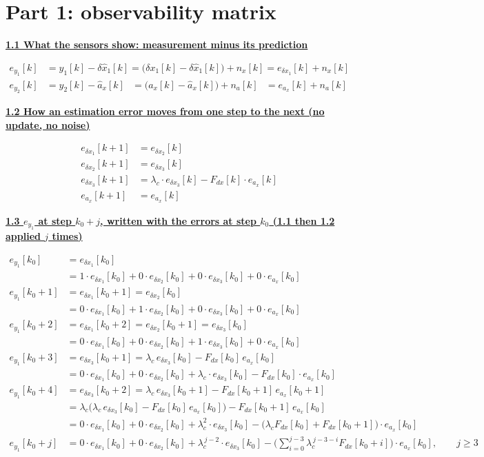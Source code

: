 \documentclass[11pt,a4paper]{ctexart}
\newcommand{\lc}{\lambda_c}
\newcommand{\hd}[1]{\par\medskip\noindent\underline{\textbf{#1}}\par\nobreak\vspace{0.2ex}}
\begin{document}
\section{Part 1: observability matrix}

\hd{1.1 What the sensors show: measurement minus its prediction}
\[
\begin{aligned}
e_{y_1}[k] &= y_1[k] - \delta\hat x_1[k] = \big(\delta x_1[k] - \delta\hat x_1[k]\big) + n_x[k] = e_{\delta x_1}[k] + n_x[k] \\
e_{y_2}[k] &= y_2[k] - \hat a_x[k] \;\;\,= \big(a_x[k] - \hat a_x[k]\big) + n_a[k] \;\;\,= e_{a_x}[k] + n_a[k]
\end{aligned}
\]

\hd{1.2 How an estimation error moves from one step to the next (no update, no noise)}
\[
\begin{aligned}
e_{\delta x_1}[k+1] &= e_{\delta x_2}[k] \\
e_{\delta x_2}[k+1] &= e_{\delta x_3}[k] \\
e_{\delta x_3}[k+1] &= \lc \cdot e_{\delta x_3}[k] - F_{dx}[k]\cdot e_{a_x}[k] \\
e_{a_x}[k+1] &= e_{a_x}[k]
\end{aligned}
\]

\hd{1.3 $e_{y_1}$ at step $k_0+j$, written with the errors at step $k_0$ (1.1 then 1.2 applied $j$ times)}
\[
\begin{aligned}
e_{y_1}[k_0] &= e_{\delta x_1}[k_0] \\
&= 1\cdot e_{\delta x_1}[k_0] + 0\cdot e_{\delta x_2}[k_0] + 0\cdot e_{\delta x_3}[k_0] + 0\cdot e_{a_x}[k_0] \\[1ex]
e_{y_1}[k_0+1] &= e_{\delta x_1}[k_0+1] = e_{\delta x_2}[k_0] \\
&= 0\cdot e_{\delta x_1}[k_0] + 1\cdot e_{\delta x_2}[k_0] + 0\cdot e_{\delta x_3}[k_0] + 0\cdot e_{a_x}[k_0] \\[1ex]
e_{y_1}[k_0+2] &= e_{\delta x_1}[k_0+2] = e_{\delta x_2}[k_0+1] = e_{\delta x_3}[k_0] \\
&= 0\cdot e_{\delta x_1}[k_0] + 0\cdot e_{\delta x_2}[k_0] + 1\cdot e_{\delta x_3}[k_0] + 0\cdot e_{a_x}[k_0] \\[1ex]
e_{y_1}[k_0+3] &= e_{\delta x_3}[k_0+1] = \lc\, e_{\delta x_3}[k_0] - F_{dx}[k_0]\, e_{a_x}[k_0] \\
&= 0\cdot e_{\delta x_1}[k_0] + 0\cdot e_{\delta x_2}[k_0] + \lc\cdot e_{\delta x_3}[k_0] - F_{dx}[k_0]\cdot e_{a_x}[k_0] \\[1ex]
e_{y_1}[k_0+4] &= e_{\delta x_3}[k_0+2] = \lc\, e_{\delta x_3}[k_0+1] - F_{dx}[k_0+1]\, e_{a_x}[k_0+1] \\
&= \lc\big(\lc\, e_{\delta x_3}[k_0] - F_{dx}[k_0]\, e_{a_x}[k_0]\big) - F_{dx}[k_0+1]\, e_{a_x}[k_0] \\
&= 0\cdot e_{\delta x_1}[k_0] + 0\cdot e_{\delta x_2}[k_0] + \lc^2\cdot e_{\delta x_3}[k_0] - \big(\lc F_{dx}[k_0] + F_{dx}[k_0+1]\big)\cdot e_{a_x}[k_0] \\[1ex]
e_{y_1}[k_0+j] &= 0\cdot e_{\delta x_1}[k_0] + 0\cdot e_{\delta x_2}[k_0] + \lc^{\,j-2}\cdot e_{\delta x_3}[k_0]
- \Big(\textstyle\sum_{i=0}^{j-3}\lc^{\,j-3-i}F_{dx}[k_0+i]\Big)\cdot e_{a_x}[k_0], \qquad j \ge 3
\end{aligned}
\]
\end{document}
